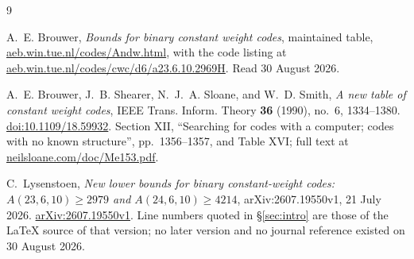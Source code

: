 \documentclass[11pt]{amsart}
\theoremstyle{remark}
\begin{document}
\begin{thebibliography}{9}

A.~E. Brouwer,
\emph{Bounds for binary constant weight codes}, maintained table,
\href{https://aeb.win.tue.nl/codes/Andw.html}{aeb.win.tue.nl/codes/Andw.html},
with the code listing at
\href{https://aeb.win.tue.nl/codes/cwc/d6/a23.6.10.2969H}{aeb.win.tue.nl/codes/cwc/d6/a23.6.10.2969H}.
Read 30 August 2026.

A.~E. Brouwer, J.~B. Shearer, N.~J.~A. Sloane, and W.~D. Smith,
\emph{A new table of constant weight codes},
IEEE Trans. Inform. Theory \textbf{36} (1990), no.~6, 1334--1380.
\href{https://doi.org/10.1109/18.59932}{doi:10.1109/18.59932}.
Section XII, ``Searching for codes with a computer; codes with no known structure'',
pp.~1356--1357, and Table XVI;
full text at \href{https://neilsloane.com/doc/Me153.pdf}{neilsloane.com/doc/Me153.pdf}.

C.~Lysenstoen,
\emph{New lower bounds for binary constant-weight codes: $A(23,6,10)\ge2979$ and
$A(24,6,10)\ge4214$},
arXiv:2607.19550v1, 21 July 2026.
\href{https://arxiv.org/abs/2607.19550v1}{arXiv:2607.19550v1}.
Line numbers quoted in \S\ref{sec:intro} are those of the \LaTeX{} source of that version; no
later version and no journal reference existed on 30 August 2026.

\end{thebibliography}
\end{document}
